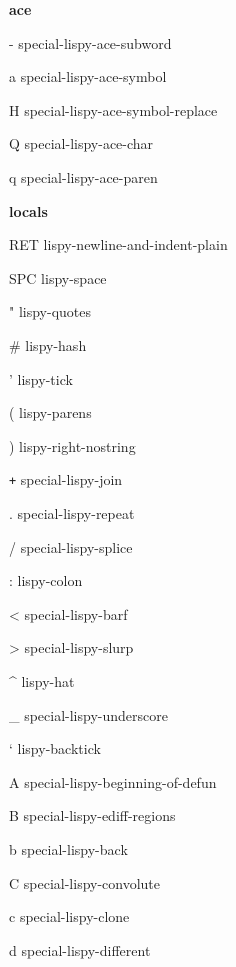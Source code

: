 \documentclass[a4paper,10pt]{article}
\renewcommand\section[1]{\bigskip\par\textbf{\large#1}\medskip}
\newcommand\keyify[1]{\keys{\ttfamily#1}}
\begin{document}
\begin{multicols*}{3}
\newpage

\section{ace}
\begin{keylist}[labelwidth=\widthof{\keyify{-}}]
	\item[-] special-lispy-ace-subword
	\item[a] special-lispy-ace-symbol
	\item[H] special-lispy-ace-symbol-replace
	\item[Q] special-lispy-ace-char
	\item[q] special-lispy-ace-paren
\end{keylist}


\section{locals}
\begin{keylist}[labelwidth=\widthof{\keyify{<backtab>}}]
	\item[RET] lispy-newline-and-indent-plain
	\item[SPC] lispy-space
	\item["] lispy-quotes
	\item[\#] lispy-hash
	\item['] lispy-tick
	\item[(] lispy-parens
	\item[)] lispy-right-nostring
	\item[\texttt{+}] special-lispy-join
	\item[.] special-lispy-repeat
	\item[/] special-lispy-splice
	\item[:] lispy-colon
	\item[<] special-lispy-barf
	\item[>] special-lispy-slurp
	\item[\textasciicircum] lispy-hat
	\item[\_] special-lispy-underscore
	\item[`] lispy-backtick
	\item[A] special-lispy-beginning-of-defun
	\item[B] special-lispy-ediff-regions
	\item[b] special-lispy-back
	\item[C] special-lispy-convolute
	\item[c] special-lispy-clone
	\item[d] special-lispy-different

\end{keylist}
\end{multicols*}
\end{document}
